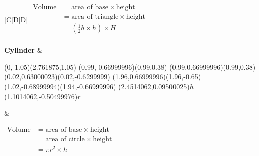 \begin{table*}[h]
\begin{tabular}{|C|D|D|}
$\begin{aligned}
\mbox{Volume} &= \mbox{area of base} \times \mbox{height} \\
              &= \mbox{area of triangle} \times \mbox{height} \\
              &= \left(\frac{1}{2}b\times h\right) \times H \\
\end{aligned}$  \\ \hline

\textbf{Cylinder} &
\begin{center}
\scalebox{1} %
{
\begin{pspicture}(0,-1.05)(2.761875,1.05)
\psellipse[linewidth=0.04,dimen=outer](0.99,-0.66999996)(0.99,0.38)
\psellipse[linewidth=0.04,dimen=outer](0.99,0.66999996)(0.99,0.38)
\psline[linewidth=0.04cm](0.02,0.63000023)(0.02,-0.6299999)
\psline[linewidth=0.04cm](1.96,0.66999996)(1.96,-0.65)
\psline[linewidth=0.04cm,linestyle=dashed,dash=0.16cm 0.16cm](1.02,-0.68999994)(1.94,-0.66999996)
\rput(2.4514062,0.09500025){$h$}
\rput(1.1014062,-0.50499976){$r$}
\end{pspicture} 
}
\end{center}
&

$\begin{aligned}
\mbox{Volume} &= \mbox{area of base} \times \mbox{height} \\
              &= \mbox{area of circle} \times \mbox{height} \\
              &= \pi r^2 \times h \\
\end{aligned}$  \\ \hline



\end{tabular}
\end{table*}




